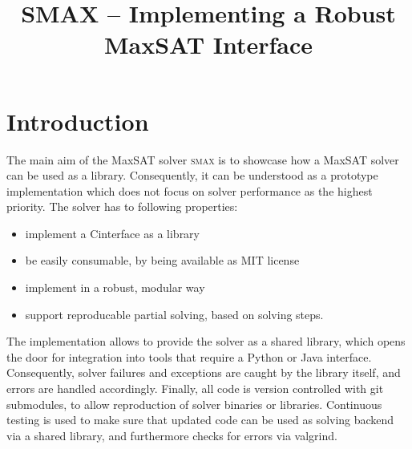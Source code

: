 \documentclass[conference]{IEEEtran}
\def\CC{{C\nolinebreak[4]\hspace{-.05em}\raisebox{.4ex}{\tiny\bf ++}}}
\begin{document}
    
\title{SMAX -- Implementing a Robust MaxSAT Interface}

\author{
}

\maketitle

\def\smax{\textsc{smax}\xspace}
\def\openwbo{\textsc{Open-WBO}\xspace}
\def\glucose{\textsc{Glucose~4.1}\xspace}
\def\minisat{\textsc{Minisat~2.2}\xspace}
\def\mergesat{\textsc{MergeSAT}\xspace}


\section{Introduction}

The main aim of the MaxSAT solver \smax is to showcase how a MaxSAT solver can be used as a library.
Consequently, it can be understood as a prototype implementation which does not focus on solver performance as the highest priority.
The solver has to following properties:
%
\begin{itemize}
 \item implement a \CC interface as a library
 \item be easily consumable, by being available as MIT license
 \item implement in a robust, modular way
 \item support reproducable partial solving, based on solving steps.
\end{itemize}
%
The implementation allows to provide the solver as a shared library, which opens the door for integration into tools that require a Python or Java interface.
Consequently, solver failures and exceptions are caught by the library itself, and errors are handled accordingly.
Finally, all code is version controlled with git submodules, to allow reproduction of solver binaries or libraries.
Continuous testing is used to make sure that updated code can be used as solving backend via a shared library, and furthermore checks for errors via valgrind.
\end{document}
